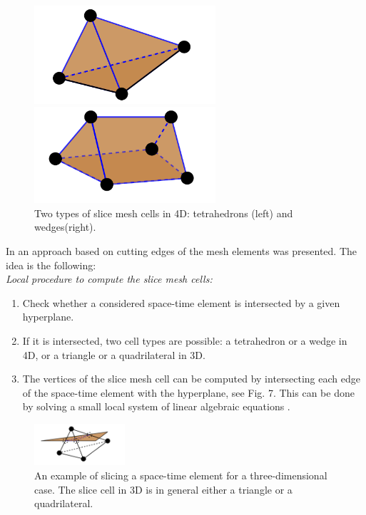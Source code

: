 \documentclass[12pt]{article}
\begin{document}
\begin{figure}[h]
\begin{minipage}{0.5\textwidth}
\centering
\includegraphics[width = 0.6\textwidth]{tetra.png}
\end{minipage}
\hfill
\begin{minipage}{0.5\textwidth}
\centering
\includegraphics[width = 0.6\textwidth]{wedge.png}
\end{minipage}
\caption{Two types of slice mesh cells in 4D: tetrahedrons (left) and wedges(right).}
\end{figure}


In \cite{NeumuellerViz} an approach based on cutting edges of the mesh elements was presented. The idea is the following: \\
\textit{Local procedure to compute the slice mesh cells:}
\begin{enumerate}
	\item Check whether a considered space-time element is intersected by a given hyperplane.
	\item If it is intersected, two cell types are possible: a tetrahedron or a wedge in 4D, or a triangle or a quadrilateral in 3D. 
	\item The vertices of the slice mesh cell can be computed by intersecting each edge of the space-time element with the hyperplane, see Fig. 7. This can be done by solving a small local system of linear algebraic equations \cite{NeumuellerViz}.
\end{enumerate}

\begin{figure}[h]
\centering
\includegraphics[width = 0.3\textwidth]{sliced_tetra.png}
\caption{An example of slicing a space-time element for a three-dimensional case. The slice cell in 3D is in general either a triangle or a quadrilateral.}
\end{figure}
\end{document}
